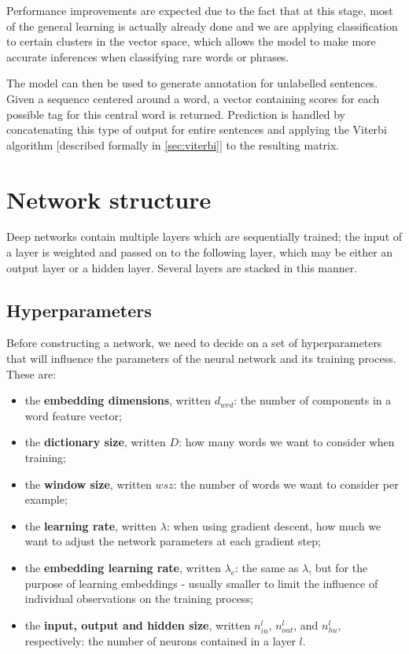 Performance improvements are expected due to the fact that at this
stage, most of the general learning is actually already done and we
are applying classification to certain clusters in the vector space,
which allows the model to make more accurate inferences when
classifying rare words or phrases.

The model can then be used to generate annotation for unlabelled
sentences. Given a sequence centered around a word, a vector
containing scores for each possible tag for this central word is
returned. Prediction is handled by concatenating this type of output
for entire sentences and applying the Viterbi algorithm [described
formally in \ref{sec:viterbi}] to the resulting matrix.

\section{Network structure}
\label{sec:networkstructure}

Deep networks contain multiple layers which are sequentially trained;
the input of a layer is weighted and passed on to the following layer,
which may be either an output layer or a hidden layer. Several layers
are stacked in this manner.

\subsection{Hyperparameters}

Before constructing a network, we need to decide on a set of
hyperparameters that will influence the parameters of the neural
network and its training process. These are:

\begin{itemize}
\item the \textbf{embedding dimensions}, written $d_{wrd}$: the number
of components in a word feature vector;
\item the \textbf{dictionary size}, written $D$: how many words we
want to consider when training;
\item the \textbf{window size}, written $wsz$: the number of words we
want to consider per example;
\item the \textbf{learning rate}, written $\lambda$: when using
gradient descent, how much we want to adjust the network parameters at
each gradient step;
\item the \textbf{embedding learning rate}, written $\lambda_{e}$: the
same as $\lambda$, but for the purpose of learning embeddings -
usually smaller to limit the influence of individual observations on
the training process;
\item the \textbf{input, output and hidden size}, written $n^l_{in}$,
$n^l_{out}$, and $n^l_{hu}$, respectively: the number of neurons
contained in a layer $l$.
\end{itemize}

